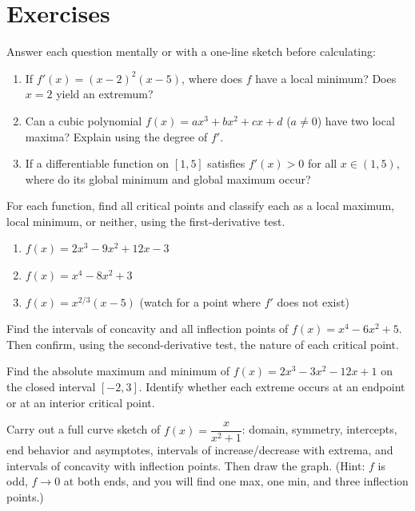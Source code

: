 \section*{Exercises}

\begin{exercise}\label{ch16:ex-warmup}
Answer each question mentally or with a one-line sketch before calculating:
\begin{enumerate}
\item If $f'(x) = (x-2)^2(x-5)$, where does $f$ have a local minimum? Does $x=2$ yield an extremum?
\item Can a cubic polynomial $f(x)=ax^3+bx^2+cx+d$ ($a\ne0$) have two local maxima? Explain using the degree of $f'$.
\item If a differentiable function on $[1,5]$ satisfies $f'(x)>0$ for all $x\in(1,5)$, where do its global minimum and global maximum occur?
\end{enumerate}
\end{exercise}

\begin{exercise}\label{ch16:exA}
For each function, find all critical points and classify each as a local maximum,
local minimum, or neither, using the first-derivative test.
\begin{enumerate}
\item $f(x)=2x^3-9x^2+12x-3$
\item $f(x)=x^4-8x^2+3$
\item $f(x)=x^{2/3}(x-5)$ \quad(watch for a point where $f'$ does not exist)
\end{enumerate}
\end{exercise}

\begin{exercise}\label{ch16:exB}
Find the intervals of concavity and all inflection points of
$f(x)=x^4-6x^2+5$. Then confirm, using the second-derivative test, the nature of
each critical point.
\end{exercise}

\begin{exercise}\label{ch16:exC}
Find the absolute maximum and minimum of $f(x)=2x^3-3x^2-12x+1$ on the closed
interval $[-2,3]$. Identify whether each extreme occurs at an endpoint or at an
interior critical point.
\end{exercise}

\begin{exercise}\label{ch16:exD}
Carry out a full curve sketch of $f(x)=\dfrac{x}{x^2+1}$: domain, symmetry,
intercepts, end behavior and asymptotes, intervals of increase/decrease with
extrema, and intervals of concavity with inflection points. Then draw the graph.
(Hint: $f$ is odd, $f\to0$ at both ends, and you will find one max, one min, and
three inflection points.)
\end{exercise}

